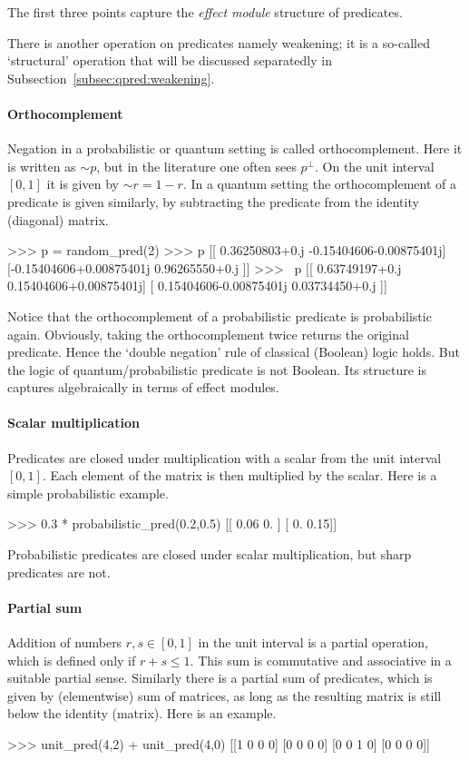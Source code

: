 \documentclass[leqno]{tufte-book} %
\newcommand{\ortho}{\mathop{\sim}}
\begin{document}
\noindent The first three points capture the \emph{effect module}
structure of predicates. 

There is another operation on predicates namely weakening; it is a
so-called `structural' operation that will be discussed separatedly in
Subsection~\ref{subsec:qpred:weakening}.


\paragraph{Orthocomplement} Negation in a probabilistic or quantum
setting is called orthocomplement.
Here it is written as $\ortho p$, but in the literature one often sees
$p^{\bot}$. On the unit interval $[0,1]$ it is given by $\ortho r = 1
- r$. In a quantum setting the orthocomplement of a predicate is given
similarly, by subtracting the predicate from the identity (diagonal)
matrix.
\begin{python}
>>> p = random_pred(2)
>>> p
[[ 0.36250803+0.j         -0.15404606-0.00875401j]
 [-0.15404606+0.00875401j  0.96265550+0.j        ]]
>>> ~p
[[ 0.63749197+0.j          0.15404606+0.00875401j]
 [ 0.15404606-0.00875401j  0.03734450+0.j        ]]
\end{python}

\noindent Notice that the orthocomplement of a probabilistic predicate
is probabilistic again. Obviously, taking the orthocomplement twice
returns the original predicate. Hence the `double negation' rule of
classical (Boolean) logic holds. But the logic of
quantum/probabilistic predicate is not Boolean. Its structure is
captures algebraically in terms of effect modules.


\paragraph{Scalar multiplication} Predicates are closed under
multiplication with a scalar
from the unit interval $[0,1]$.  Each element of the matrix is then
multiplied by the scalar.  Here is a simple probabilistic example.
\begin{python}
>>> 0.3 * probabilistic_pred(0.2,0.5)
[[ 0.06  0.  ]
 [ 0.    0.15]]
\end{python}

\noindent Probabilistic predicates are closed under scalar
multiplication, but sharp predicates are not.


\paragraph{Partial sum} Addition of numbers $r,s\in [0,1]$ in
the unit interval is a partial operation, which is defined only if
$r+s\leq 1$. This sum is commutative and associative in a suitable
partial sense. Similarly there is a partial
sum of predicates, which is
given by (elementwise) sum of matrices, as long as the resulting
matrix is still below the identity (matrix). Here is an example.
\begin{python}
>>> unit_pred(4,2) + unit_pred(4,0)
[[1 0 0 0]
 [0 0 0 0]
 [0 0 1 0]
 [0 0 0 0]]
\end{python}
\end{document}
